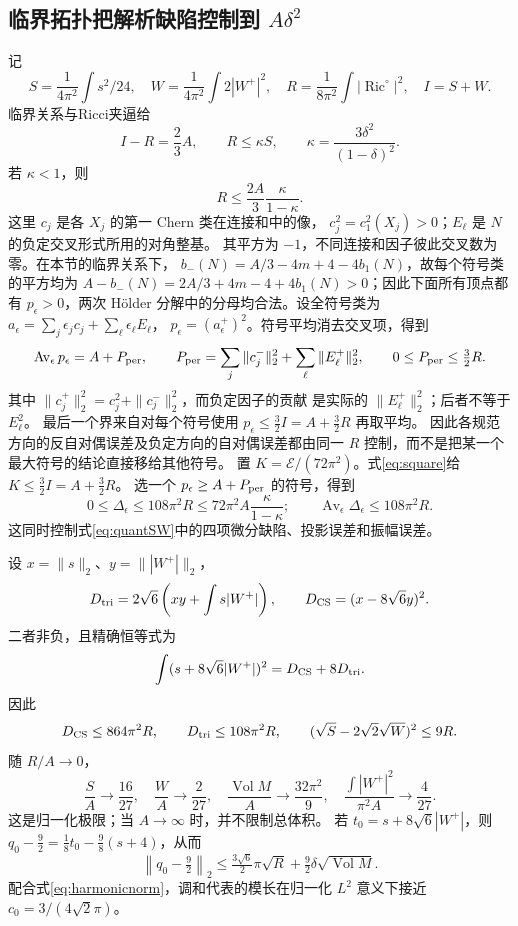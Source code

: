 \documentclass[UTF8,a4paper,11pt,fontset=fandol]{ctexart}
\numberwithin{equation}{section}
\theoremstyle{definition}
\newcommand{\Ric}{\operatorname{Ric}}
\newcommand{\Vol}{\operatorname{Vol}}
\begin{document}
\subsection{临界拓扑把解析缺陷控制到 $A\delta^2$}
记
\[
S=\frac1{4\pi^2}\int s^2/24,\quad
W=\frac1{4\pi^2}\int2|W^+|^2,\quad
R=\frac1{8\pi^2}\int|\Ric^\circ|^2,\quad I=S+W.
\]
临界关系与Ricci夹逼给
\[
I-R=\frac23A,\qquad R\le\kappa S,\qquad
\kappa=\frac{3\delta^2}{(1-\delta)^2}.
\]
若 $\kappa<1$，则
\begin{equation}\label{eq:Rmax}
R\le\frac{2A}{3}\frac{\kappa}{1-\kappa}.
\end{equation}
这里 $c_j$ 是各 $X_j$ 的第一 Chern 类在连接和中的像，
$c_j^2=c_1^2(X_j)>0$；$E_\ell$ 是 $N$ 的负定交叉形式所用的对角整基。
其平方为 $-1$，不同连接和因子彼此交叉数为零。在本节的临界关系下，
$b_-(N)=A/3-4m+4-4b_1(N)$，故每个符号类的平方均为
$A-b_-(N)=2A/3+4m-4+4b_1(N)>0$；因此下面所有顶点都有
$p_\epsilon>0$，两次 H\"older 分解中的分母均合法。设全符号类为
$a_\epsilon=\sum_j\epsilon_jc_j+\sum_\ell\epsilon_\ell E_\ell$，
$p_\epsilon=(a_\epsilon^+)^2$。符号平均消去交叉项，得到
\[
\operatorname{Av}_\epsilon p_\epsilon
=A+P_{\rm per},\qquad
P_{\rm per}=\sum_j\|c_j^-\|_2^2+\sum_\ell\|E_\ell^+\|_2^2,\qquad
0\le P_{\rm per}\le\tfrac32R.
\]
其中 $\|c_j^+\|_2^2=c_j^2+\|c_j^-\|_2^2$，而负定因子的贡献
是实际的 $\|E_\ell^+\|_2^2$；后者不等于 $E_\ell^2$。
最后一个界来自对每个符号使用
$p_\epsilon\le\tfrac32I=A+\tfrac32R$ 再取平均。
因此各规范方向的反自对偶误差及负定方向的自对偶误差都由同一 $R$
控制，而不是把某一个最大符号的结论直接移给其他符号。
置 $K=\mathcal E/(72\pi^2)$。式\eqref{eq:square}给
$K\le\tfrac32I=A+\tfrac32R$。
选一个 $p_\epsilon\ge A+P_{\rm per}$ 的符号，得到
\[
0\le\Delta_\epsilon\le108\pi^2R
\le72\pi^2A\frac{\kappa}{1-\kappa};
\qquad
\operatorname{Av}_\epsilon\Delta_\epsilon\le108\pi^2R.
\]
这同时控制式\eqref{eq:quantSW}中的四项微分缺陷、投影误差和振幅误差。

设 $x=\|s\|_2$、$y=\||W^+|\|_2$，
\[
D_{\rm tri}=2\sqrt6\left(xy+\int s|W^+|\right),\qquad
D_{\rm CS}=(x-8\sqrt6y)^2.
\]
二者非负，且精确恒等式为
\[
\int(s+8\sqrt6|W^+|)^2=D_{\rm CS}+8D_{\rm tri}.
\]
因此
\[
D_{\rm CS}\le864\pi^2R,\qquad D_{\rm tri}\le108\pi^2R,\qquad
(\sqrt S-2\sqrt2\sqrt W)^2\le9R.
\]
随 $R/A\to0$，
\[
\frac SA\to\frac{16}{27},\quad
\frac WA\to\frac{2}{27},\quad
\frac{\Vol M}{A}\to\frac{32\pi^2}{9},\quad
\frac{\int|W^+|^2}{\pi^2A}\to\frac4{27}.
\]
这是归一化极限；当 $A\to\infty$ 时，并不限制总体积。
若 $t_0=s+8\sqrt6|W^+|$，则
$q_0-\tfrac92=\tfrac18t_0-\tfrac98(s+4)$，从而
\[
\left\|q_0-\tfrac92\right\|_2
\le\tfrac{3\sqrt6}{2}\pi\sqrt R
+\tfrac92\delta\sqrt{\Vol M}.
\]
配合式\eqref{eq:harmonicnorm}，调和代表的模长在归一化 $L^2$ 意义下接近
$c_0=3/(4\sqrt2\pi)$。
\end{document}
